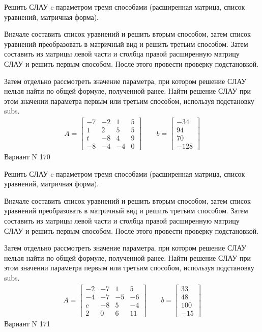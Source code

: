 \documentclass[11pt]{report}
\begin{document}
Решить СЛАУ c параметром тремя способами (расширенная матрица, список уравнений, матричная форма).

Вначале составить список уравнений и решить вторым способом,
затем список уравнений преобразовать в матричный вид и решить третьим способом.
Затем составить из матрицы левой части и столбца правой расширенную матрицу СЛАУ и решить первым способом.
После этого провести проверку подстановкой.

Затем отдельно рассмотреть значение параметра, при котором решение СЛАУ нельзя найти по общей формуле,
полученной ранее.
Найти решение СЛАУ при этом значении параметра первым или третьим способом, используя подстановку subs.
\begin{align*}
    A = \left[\begin{matrix}-7 & -2 & 1 & 5\\1 & 2 & 5 & 5\\t & -8 & 4 & 9\\-8 & -4 & -4 & 0\end{matrix}\right]
\qquad b = \left[\begin{matrix}-34\\94\\70\\-128\end{matrix}\right]
\end{align*}
\newpage
Вариант N 170


Решить СЛАУ c параметром тремя способами (расширенная матрица, список уравнений, матричная форма).

Вначале составить список уравнений и решить вторым способом,
затем список уравнений преобразовать в матричный вид и решить третьим способом.
Затем составить из матрицы левой части и столбца правой расширенную матрицу СЛАУ и решить первым способом.
После этого провести проверку подстановкой.

Затем отдельно рассмотреть значение параметра, при котором решение СЛАУ нельзя найти по общей формуле,
полученной ранее.
Найти решение СЛАУ при этом значении параметра первым или третьим способом, используя подстановку subs.
\begin{align*}
    A = \left[\begin{matrix}-2 & -7 & 1 & 5\\-4 & -7 & -5 & -6\\c & -8 & 5 & -4\\2 & 0 & 6 & 11\end{matrix}\right]
\qquad b = \left[\begin{matrix}33\\48\\100\\-15\end{matrix}\right]
\end{align*}
\newpage
Вариант N 171
\end{document}
